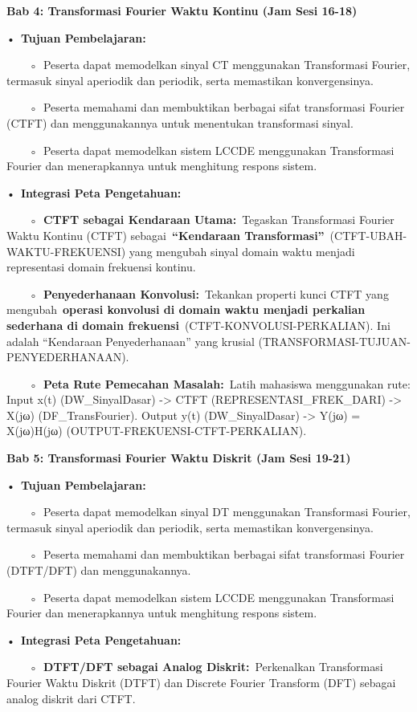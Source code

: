 \documentclass[
  letterpaper,
  DIV=11,
  numbers=noendperiod]{scrreprt}
\begin{document}
\textbf{Bab 4: Transformasi Fourier Waktu Kontinu (Jam Sesi 16-18)}

•~\textbf{Tujuan Pembelajaran:}

~~~~◦~Peserta dapat memodelkan sinyal CT menggunakan Transformasi
Fourier, termasuk sinyal aperiodik dan periodik, serta memastikan
konvergensinya.

~~~~◦~Peserta memahami dan membuktikan berbagai sifat transformasi
Fourier (CTFT) dan menggunakannya untuk menentukan transformasi sinyal.

~~~~◦~Peserta dapat memodelkan sistem LCCDE menggunakan Transformasi
Fourier dan menerapkannya untuk menghitung respons sistem.

•~\textbf{Integrasi Peta Pengetahuan:}

~~~~◦~\textbf{CTFT sebagai Kendaraan Utama:}~Tegaskan Transformasi
Fourier Waktu Kontinu (CTFT) sebagai~\textbf{``Kendaraan
Transformasi''}~(CTFT-UBAH-WAKTU-FREKUENSI) yang mengubah sinyal domain
waktu menjadi representasi domain frekuensi kontinu.

~~~~◦~\textbf{Penyederhanaan Konvolusi:}~Tekankan properti kunci CTFT
yang mengubah~\textbf{operasi konvolusi di domain waktu menjadi
perkalian sederhana di domain frekuensi}~(CTFT-KONVOLUSI-PERKALIAN). Ini
adalah ``Kendaraan Penyederhanaan'' yang krusial
(TRANSFORMASI-TUJUAN-PENYEDERHANAAN).

~~~~◦~\textbf{Peta Rute Pemecahan Masalah:}~Latih mahasiswa menggunakan
rute: Input x(t) (DW\_SinyalDasar) -\textgreater{} CTFT
(REPRESENTASI\_FREK\_DARI) -\textgreater{} X(jω) (DF\_TransFourier).
Output y(t) (DW\_SinyalDasar) -\textgreater{} Y(jω) = X(jω)H(jω)
(OUTPUT-FREKUENSI-CTFT-PERKALIAN).

\textbf{Bab 5: Transformasi Fourier Waktu Diskrit (Jam Sesi 19-21)}

•~\textbf{Tujuan Pembelajaran:}

~~~~◦~Peserta dapat memodelkan sinyal DT menggunakan Transformasi
Fourier, termasuk sinyal aperiodik dan periodik, serta memastikan
konvergensinya.

~~~~◦~Peserta memahami dan membuktikan berbagai sifat transformasi
Fourier (DTFT/DFT) dan menggunakannya.

~~~~◦~Peserta dapat memodelkan sistem LCCDE menggunakan Transformasi
Fourier dan menerapkannya untuk menghitung respons sistem.

•~\textbf{Integrasi Peta Pengetahuan:}

~~~~◦~\textbf{DTFT/DFT sebagai Analog Diskrit:}~Perkenalkan Transformasi
Fourier Waktu Diskrit (DTFT) dan Discrete Fourier Transform (DFT)
sebagai analog diskrit dari CTFT.
\end{document}
